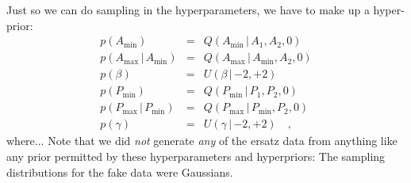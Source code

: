 \documentclass[12pt]{article}
\newcommand{\given}{\,|\,}
\newcommand{\pdf}{p}
\newcommand{\amp}{A}
\newcommand{\period}{P}
\newcommand{\ampmin}{\amp_{\min}}
\newcommand{\ampmax}{\amp_{\max}}
\newcommand{\amppower}{\beta}
\newcommand{\periodmin}{\period_{\min}}
\newcommand{\periodmax}{\period_{\max}}
\newcommand{\periodpower}{\gamma}
\newcommand{\powerlaw}{Q}
\newcommand{\uniform}{U}
\begin{document}
Just so we can do sampling in the hyperparameters, we have to make up
a hyper-prior:
\begin{eqnarray}
\pdf(\ampmin)
  &=&
\powerlaw(\ampmin\given\amp_1,\amp_2,0)
\\
\pdf(\ampmax\given\ampmin)
  &=&
\powerlaw(\ampmax\given\ampmin,\amp_2,0)
\\
\pdf(\amppower)
  &=&
\uniform(\amppower\given {-2},{+2})
\\
\pdf(\periodmin)
  &=&
\powerlaw(\periodmin\given\period_1,\period_2,0)
\\
\pdf(\periodmax\given\periodmin)
  &=&
\powerlaw(\periodmax\given\periodmin,\period_2,0)
\\
\pdf(\periodpower)
  &=&
\uniform(\periodpower\given {-2},{+2})
\quad,
\end{eqnarray}
where...  Note that we did \emph{not} generate \emph{any} of the
ersatz data from anything like any prior permitted by these
hyperparameters and hyperpriors: The sampling distributions for the
fake data were Gaussians.
\end{document}
